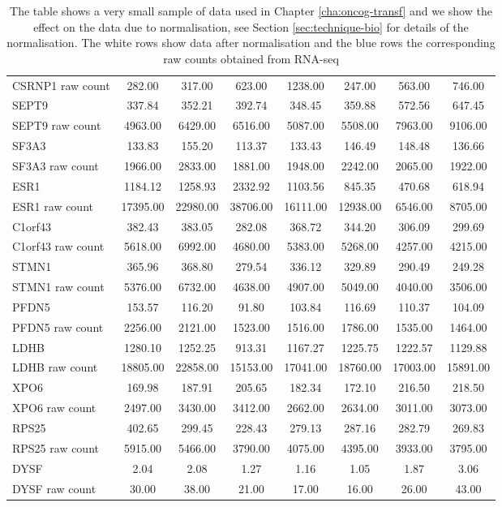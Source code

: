 \begin{table}[ht]
\begin{tabular}{l|ccccccc}
  CSRNP1 raw count & 282.00 & 317.00 & 623.00 & 1238.00 & 247.00 & 563.00 & 746.00 \\
  SEPT9 & 337.84 & 352.21 & 392.74 & 348.45 & 359.88 & 572.56 & 647.45 \\
  SEPT9 raw count & 4963.00 & 6429.00 & 6516.00 & 5087.00 & 5508.00 & 7963.00 & 9106.00 \\
  SF3A3 & 133.83 & 155.20 & 113.37 & 133.43 & 146.49 & 148.48 & 136.66 \\
  SF3A3 raw count & 1966.00 & 2833.00 & 1881.00 & 1948.00 & 2242.00 & 2065.00 & 1922.00 \\
  ESR1 & 1184.12 & 1258.93 & 2332.92 & 1103.56 & 845.35 & 470.68 & 618.94 \\
  ESR1 raw count & 17395.00 & 22980.00 & 38706.00 & 16111.00 & 12938.00 & 6546.00 & 8705.00 \\
  C1orf43 & 382.43 & 383.05 & 282.08 & 368.72 & 344.20 & 306.09 & 299.69 \\
  C1orf43 raw count & 5618.00 & 6992.00 & 4680.00 & 5383.00 & 5268.00 & 4257.00 & 4215.00 \\
  STMN1 & 365.96 & 368.80 & 279.54 & 336.12 & 329.89 & 290.49 & 249.28 \\
  STMN1 raw count & 5376.00 & 6732.00 & 4638.00 & 4907.00 & 5049.00 & 4040.00 & 3506.00 \\
  PFDN5 & 153.57 & 116.20 & 91.80 & 103.84 & 116.69 & 110.37 & 104.09 \\
  PFDN5 raw count & 2256.00 & 2121.00 & 1523.00 & 1516.00 & 1786.00 & 1535.00 & 1464.00 \\
  LDHB & 1280.10 & 1252.25 & 913.31 & 1167.27 & 1225.75 & 1222.57 & 1129.88 \\
  LDHB raw count & 18805.00 & 22858.00 & 15153.00 & 17041.00 & 18760.00 & 17003.00 & 15891.00 \\
  XPO6 & 169.98 & 187.91 & 205.65 & 182.34 & 172.10 & 216.50 & 218.50 \\
  XPO6 raw count & 2497.00 & 3430.00 & 3412.00 & 2662.00 & 2634.00 & 3011.00 & 3073.00 \\
  RPS25 & 402.65 & 299.45 & 228.43 & 279.13 & 287.16 & 282.79 & 269.83 \\
  RPS25 raw count & 5915.00 & 5466.00 & 3790.00 & 4075.00 & 4395.00 & 3933.00 & 3795.00 \\
  DYSF & 2.04 & 2.08 & 1.27 & 1.16 & 1.05 & 1.87 & 3.06 \\
  DYSF raw count & 30.00 & 38.00 & 21.00 & 17.00 & 16.00 & 26.00 & 43.00 \\
   \hline
\end{tabular}
\caption{The table shows a very small sample of data used in Chapter \protect\ref{cha:oncog-transf} and we show the effect on the data due to normalisation, see Section \protect\ref{sec:technique-bio} for details of the normalisation. The white rows show data after normalisation and the blue rows the corresponding raw counts obtained from RNA-seq}
\label{tab:norm-mcf10a}
\end{table}
\restoregeometry


